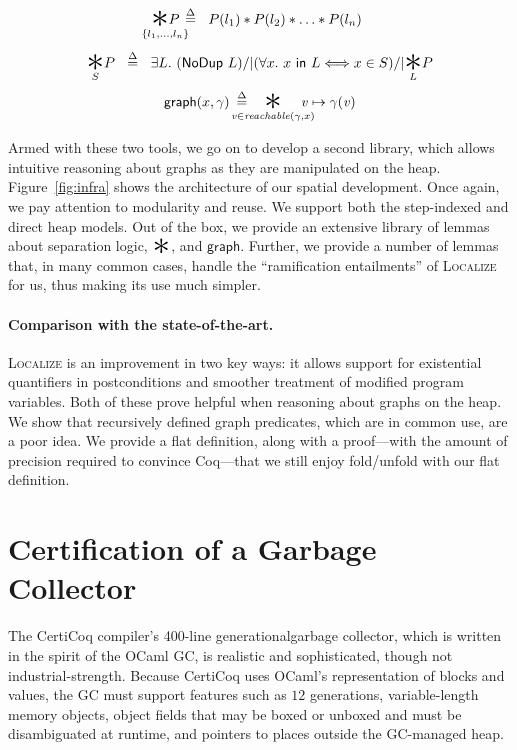 \documentclass[sigplan, anonymous=false, review=false]{acmart}
\newcommand{\p}[1]{\ensuremath{\mathsf{#1}}} %
\newcommand{\m}[1]{\ensuremath{\mathit{#1}}} %
\newcommand{\infrulestyle}[1]{\textsc{#1}}
\newcommand{\scon}{\mathbin{\star}}
\renewcommand{\scon}{\mathbin{\ast}} %
\renewcommand{\bigstar}{\raisebox{-0.24em}{{\scaleobj{2.5}{\scon}}}}
\newcommand{\defeq}{\mathbin{\stackrel{\Delta}{=}}}
\begin{document}
\vspace{-1em}
\[
\!\!\!\!\!\!\!\underset{\{l_1,\dots,l_n\}}{\bigstar P}\!\!\!\!\!\!\! ~~ \defeq ~~ P(l_1) *
  P(l_2) * \dots * P(l_n) 
  \]
\[
\underset{S}{\bigstar} P ~~ \defeq ~~ \exists L.~ (\p{NoDup}\ L) /| (\forall x.~ x\ \p{in}\ L <=> x \in S) /| \underset{L}{\bigstar}P
\]
\[\p{graph}(x, \gamma) \; \defeq \; \!\!\!\!\!\!\!\!\!\!\underset{\m{v} \in \mathit{reachable}(\gamma, x)}{\bigstar}\!\!\!\!\!\!\m{v}\mapsto\gamma(\m{v})\]



Armed with these two tools, we go on to develop a second library, which 
allows intuitive reasoning about graphs as they are manipulated on the heap.
Figure~\ref{fig:infra} shows the architecture of our spatial development.
Once again, we pay attention to modularity and reuse. 
We support both the step-indexed and direct heap models.
Out of the box, we
provide an extensive library of lemmas about separation logic, 
$\bigstar$, and \p{graph}. 
Further, we provide a number of lemmas that, in many common cases, 
handle the ``ramification entailments'' of \infrulestyle{Localize} for us, thus 
making its use much simpler. 

\paragraph{Comparison with the state-of-the-art.} 
\textsc{Localize} is an improvement in two key ways: 
it allows support for existential quantifiers in postconditions 
and smoother treatment of modified program variables.
Both of these prove helpful when reasoning about graphs on the heap.
We show that recursively defined graph predicates, which are 
in common use, are a poor idea. We provide a flat definition, 
along with a proof---with the amount of precision
required to convince Coq---that we still enjoy fold/unfold
with our flat definition.

\section{Certification of a Garbage Collector}
\label{sec:certigc}

The CertiCoq compiler's 400-line generationalgarbage collector, which is 
written in the spirit of the OCaml GC,
is realistic and sophisticated, though not
industrial-strength.
Because CertiCoq uses OCaml's representation of blocks and
values, the GC must support features such as
$12$ generations, variable-length memory objects, object fields that may be boxed
or unboxed and must be disambiguated at runtime, and pointers to places
outside the GC-managed heap. 
\end{document}
